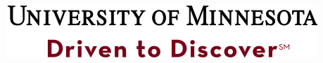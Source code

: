 \documentclass[landscape,final,a0paper,fontscale=0.33]{baposter}
\begin{document}
\begin{poster}
 {%
     \hspace{-0.1em}\includegraphics[scale = 0.4]{wordmark}
  }




\end{poster}
\end{document}
